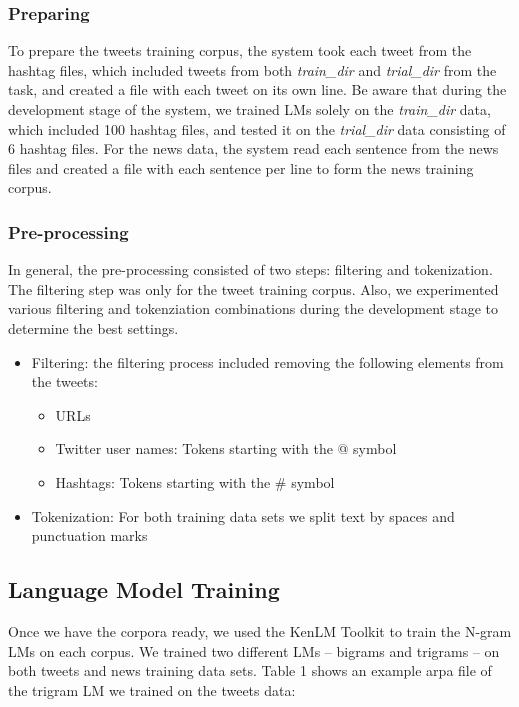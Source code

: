 \documentclass[11pt,a4paper]{article}
\begin{document}
\subsubsection{Preparing}
To prepare the tweets training corpus, the system took each tweet from the hashtag files, which included tweets from both \textit{train\_dir} and \textit{trial\_dir} from the task, and created a file with each tweet on its own line. Be aware that during the development stage of the system, we trained LMs solely on the \textit{train\_dir} data, which included 100 hashtag files, and tested it on the \textit{trial\_dir} data consisting of 6 hashtag files. For the news data, the system read each sentence from the news files and created a file with each sentence per line to form the news training corpus. 
\subsubsection{Pre-processing}
In general, the pre-processing consisted of two steps: filtering and tokenization. The filtering step was only for the tweet training corpus. Also, we experimented various filtering and tokenziation combinations during the development stage to determine the best settings. 
\begin{itemize}
\item Filtering: the filtering process included removing the following elements from the tweets:
\begin{itemize}
\item URLs
\item Twitter user names: Tokens starting with the @ symbol 
\item Hashtags: Tokens starting with the \# symbol 
\end{itemize}
\item Tokenization: For both training data sets we split text by spaces and punctuation marks
\end{itemize}

\subsection{Language Model Training}
Once we have the corpora ready, we used the KenLM Toolkit to train the N-gram LMs on each corpus. We trained two different LMs -- bigrams and trigrams -- on both tweets and news training data sets. Table 1 shows an example arpa file of the trigram LM we trained on the tweets data:
\end{document}
